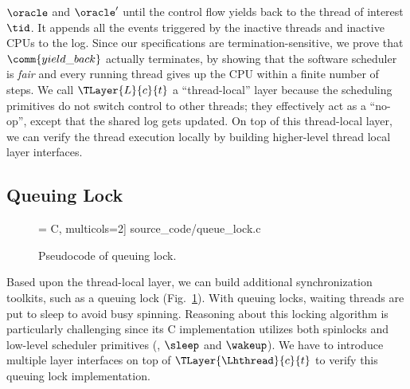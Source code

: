 $\oracle$ and $\oracle'$ until the control flow yields back to the thread of interest $\tid$.
It appends all the events triggered by the inactive threads and inactive CPUs to the log.
Since our specifications are termination-sensitive,
we prove that $\comm{yield\_back}$ actually terminates,
by showing that the software scheduler is \emph{fair} and every running
thread gives up the CPU within a finite number of steps.
We call $\TLayer{L}{c}{t}$ a ``thread-local'' layer 
because the scheduling primitives
do not switch control to other threads;
they effectively act as a ``no-op'',
except that the shared log gets updated.
On top of this thread-local layer,
we can verify the thread execution
locally by building higher-level thread local layer interfaces.
\ifTR{}{\vspace{-5pt}}
\subsection{Queuing Lock}\label{subsec:qlockimplementation}

\begin{figure}[t]
\ifTR{}{\vspace{-20pt}}
 = C, multicols=2] {source_code/queue_lock.c}
\ifTR{}{\vspace{-17pt}}
\caption{Pseudocode of queuing lock.}
\label{fig:exp:qlock}
\ifTR{}{\vspace{-8pt}}
\end{figure}
Based upon the thread-local layer,
we can build additional synchronization toolkits, such as
a queuing lock (\cf Fig.~\ref{fig:exp:qlock}).
With  queuing locks, waiting threads are put to sleep to avoid busy spinning.
Reasoning about this locking algorithm is particularly
challenging since its C implementation utilizes both
spinlocks and low-level scheduler primitives (\ie, $\sleep$ and $\wakeup$).
We have to 
introduce multiple layer interfaces on top of $\TLayer{\Lhthread}{c}{t}$ to verify this queuing lock implementation.

